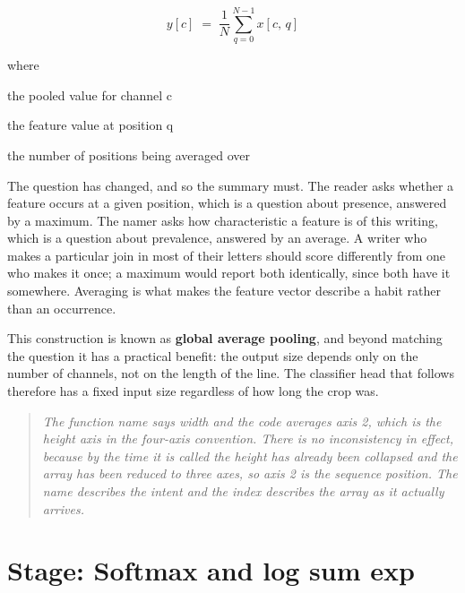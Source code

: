 \begin{equation}
y[c] \;=\; \frac{1}{N} \sum_{q=0}^{N-1} x[c,\,q]
\end{equation}

\noindent where
\begin{description}[leftmargin=2.4em,style=nextline,font=\normalfont\ttfamily]\setlength\itemsep{1pt}
  \item[{$y[c]$}] \normalfont the pooled value for channel c
  \item[{$x[c,q]$}] \normalfont the feature value at position q
  \item[{$N$}] \normalfont the number of positions being averaged over
\end{description}

The question has changed, and so the summary must. The reader asks whether a feature occurs at a given position, which is a question about presence, answered by a maximum. The namer asks how characteristic a feature is of this writing, which is a question about prevalence, answered by an average. A writer who makes a particular join in most of their letters should score differently from one who makes it once; a maximum would report both identically, since both have it somewhere. Averaging is what makes the feature vector describe a habit rather than an occurrence.

This construction is known as \textbf{global average pooling}, and beyond matching the question it has a practical benefit: the output size depends only on the number of channels, not on the length of the line. The classifier head that follows therefore has a fixed input size regardless of how long the crop was.


\begin{quote}\small\itshape The function name says width and the code averages axis 2, which is the height axis in the four-axis convention. There is no inconsistency in effect, because by the time it is called the height has already been collapsed and the array has been reduced to three axes, so axis 2 is the sequence position. The name describes the intent and the index describes the array as it actually arrives.\end{quote}


\section*{Stage: Softmax and log sum exp}
